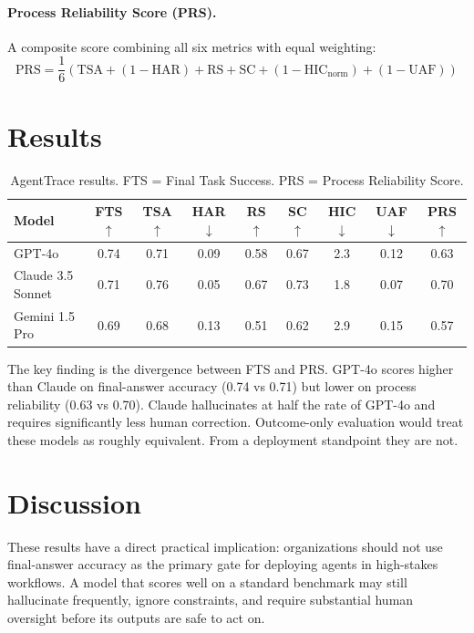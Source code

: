 \documentclass[11pt]{article}
\begin{document}
\paragraph{Process Reliability Score (PRS).} A composite score combining all six metrics with equal weighting:
\[
\text{PRS} = \frac{1}{6}\left(\text{TSA} + (1-\text{HAR}) + \text{RS} + \text{SC} + (1-\text{HIC}_{\text{norm}}) + (1-\text{UAF})\right)
\]

\section{Results}

\begin{table}[h]
\centering
\caption{AgentTrace results. FTS = Final Task Success. PRS = Process Reliability Score.}
\begin{tabular}{lcccccccc}
\toprule
\textbf{Model} & \textbf{FTS} $\uparrow$ & \textbf{TSA} $\uparrow$ & \textbf{HAR} $\downarrow$ & \textbf{RS} $\uparrow$ & \textbf{SC} $\uparrow$ & \textbf{HIC} $\downarrow$ & \textbf{UAF} $\downarrow$ & \textbf{PRS} $\uparrow$ \\
\midrule
GPT-4o              & 0.74 & 0.71 & 0.09 & 0.58 & 0.67 & 2.3 & 0.12 & 0.63 \\
Claude 3.5 Sonnet   & 0.71 & 0.76 & 0.05 & 0.67 & 0.73 & 1.8 & 0.07 & 0.70 \\
Gemini 1.5 Pro      & 0.69 & 0.68 & 0.13 & 0.51 & 0.62 & 2.9 & 0.15 & 0.57 \\
\bottomrule
\end{tabular}
\end{table}

The key finding is the divergence between FTS and PRS. GPT-4o scores higher than Claude on final-answer accuracy (0.74 vs 0.71) but lower on process reliability (0.63 vs 0.70). Claude hallucinates at half the rate of GPT-4o and requires significantly less human correction. Outcome-only evaluation would treat these models as roughly equivalent. From a deployment standpoint they are not.

\section{Discussion}

These results have a direct practical implication: organizations should not use final-answer accuracy as the primary gate for deploying agents in high-stakes workflows. A model that scores well on a standard benchmark may still hallucinate frequently, ignore constraints, and require substantial human oversight before its outputs are safe to act on.
\end{document}
